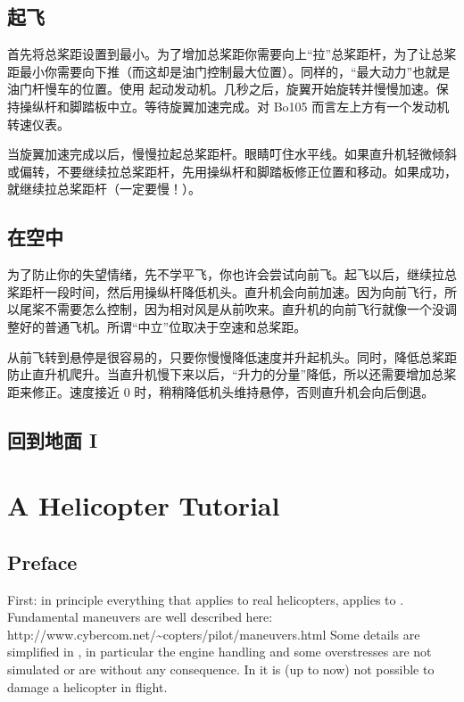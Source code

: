 
\section{起飞}

首先将总桨距设置到最小。为了增加总桨距你需要向上“拉”总桨距杆，为了让总桨距最小你需要向下推（而这却是油门控制最大位置）。同样的，“最大动力”也就是油门杆慢车的位置。使用 \key{\}} 起动发动机。几秒之后，旋翼开始旋转并慢慢加速。保持操纵杆和脚踏板中立。等待旋翼加速完成。对 Bo105 而言左上方有一个发动机转速仪表。

当旋翼加速完成以后，慢慢拉起总桨距杆。眼睛叮住水平线。如果直升机轻微倾斜或偏转，不要继续拉总桨距杆，先用操纵杆和脚踏板修正位置和移动。如果成功，就继续拉总桨距杆（一定要慢！）。

\section{在空中}

为了防止你的失望情绪，先不学平飞，你也许会尝试向前飞。起飞以后，继续拉总桨距杆一段时间，然后用操纵杆降低机头。直升机会向前加速。因为向前飞行，所以尾桨不需要怎么控制，因为相对风是从前吹来。直升机的向前飞行就像一个没调整好的普通飞机。所谓“中立”位取决于空速和总桨距。

从前飞转到悬停是很容易的，只要你慢慢降低速度并升起机头。同时，降低总桨距防止直升机爬升。当直升机慢下来以后，“升力的分量”降低，所以还需要增加总桨距来修正。速度接近 0 时，稍稍降低机头维持悬停，否则直升机会向后倒退。

\section{回到地面 I}



\iffalse
\chapter{A Helicopter Tutorial}
\label{helicopter}

\section{Preface}
 
First: in principle everything that applies to real helicopters, applies 
to \FlightGear. Fundamental maneuvers are well described here:\\ 
{http://www.cybercom.net/\~{}copters/pilot/maneuvers.html} Some details are 
simplified in \FlightGear, in particular the engine handling and some 
overstresses are not simulated or are without any consequence. 
In \FlightGear{} it is (up to now) not possible to damage a helicopter in 
flight. 

